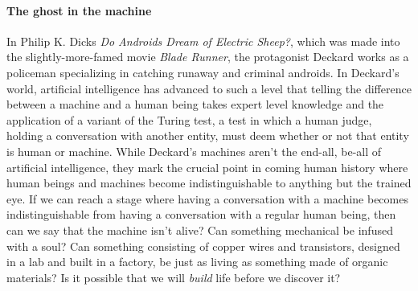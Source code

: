 
\paragraph{The ghost in the machine}

In Philip K. Dicks \emph{Do Androids Dream of Electric Sheep?}, which was made into the slightly-more-famed movie \emph{Blade Runner}, the protagonist Deckard works as a policeman specializing in catching runaway and criminal androids. In Deckard's world, artificial intelligence has advanced to such a level that telling the difference between a machine and a human being takes expert level knowledge and the application of a variant of the Turing test, a test in which a human judge, holding a conversation with another entity, must deem whether or not that entity is human or machine. 
While Deckard's machines aren't the end-all, be-all of artificial intelligence, they mark the crucial point in coming human history where human beings and machines become indistinguishable to anything but the trained eye. If we can reach a stage where having a conversation with a machine becomes indistinguishable from having a conversation with a regular human being, then can we say that the machine isn't alive? Can something mechanical be infused with a soul? Can something consisting of copper wires and transistors, designed in a lab and built in a factory, be just as living as something made of organic materials? Is it possible that we will \emph{build} life before we discover it?

